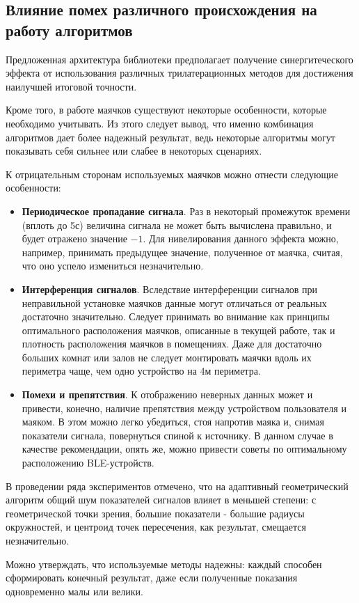 \subsection{Влияние помех различного происхождения на работу алгоритмов}

Предложенная архитектура библиотеки предполагает получение синергитеческого эффекта от использования различных трилатерационных методов для достижения наилучшей итоговой точности.

Кроме того, в работе маячков существуют некоторые особенности, которые необходимо учитывать. Из этого следует вывод, что именно комбинация алгоритмов дает более надежный результат, ведь некоторые алгоритмы могут показывать себя сильнее или слабее в некоторых сценариях.

К отрицательным сторонам используемых маячков можно отнести следующие особенности:
\begin{itemize}
    \item
    \textbf{Периодическое пропадание сигнала}. Раз в некоторый промежуток времени (вплоть до 5с) величина сигнала не может быть вычислена правильно, и будет отражено значение $-1$. Для нивелирования данного эффекта можно, например, принимать предыдущее значение, полученное от маячка, считая, что оно успело измениться незначительно.
    \item
    \textbf{Интерференция сигналов}. Вследствие интерференции сигналов при неправильной установке маячков данные могут отличаться от реальных достаточно значительно. Следует принимать во внимание как принципы оптимального расположения маячков, описанные в текущей работе, так и плотность расположения маячков в помещениях. Даже для достаточно больших комнат или залов не следует монтировать маячки вдоль их периметра чаще, чем одно устройство на 4м периметра.
    \item
    \textbf{Помехи и препятствия}. К отображению неверных данных может и привести, конечно, наличие препятствия между устройством пользователя и маяком. В этом можно легко убедиться, стоя напротив маяка и, снимая показатели сигнала, повернуться спиной к источнику. В данном случае в качестве рекомендации, опять же, можно привести советы по оптимальному расположению BLE-устройств.
\end{itemize}

В проведении ряда экспериментов отмечено, что на адаптивный геометрический алгоритм общий шум показателей сигналов влияет в меньшей степени: с геометрической точки зрения, большие показатели - большие радиусы окружностей, и центроид точек пересечения, как результат, смещается незначительно.

Можно утверждать, что используемые методы надежны: каждый способен сформировать конечный результат, даже если полученные показания одновременно малы или велики.


